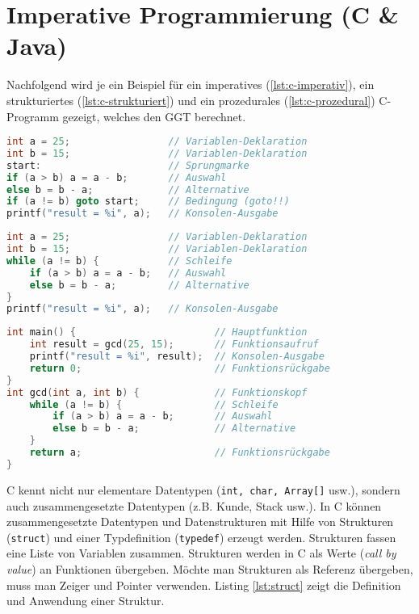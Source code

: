 \chapter{Imperative Programmierung (C \& Java)}

Nachfolgend wird je ein Beispiel für ein imperatives (\ref{lst:c-imperativ}), ein strukturiertes (\ref{lst:c-strukturiert}) und ein prozedurales (\ref{lst:c-prozedural}) C-Programm gezeigt, welches den GGT berechnet.

\begin{lstlisting}[language=C, caption=Imperatives C-Programm, label=lst:c-imperativ]
int a = 25; 				// Variablen-Deklaration
int b = 15; 				// Variablen-Deklaration
start: 						// Sprungmarke
if (a > b) a = a - b; 		// Auswahl
else b = b - a; 			// Alternative
if (a != b) goto start; 	// Bedingung (goto!!)
printf("result = %i", a); 	// Konsolen-Ausgabe
\end{lstlisting}

\begin{lstlisting}[language=C, caption=Strukturiertes C-Programm, label=lst:c-strukturiert]
int a = 25; 				// Variablen-Deklaration
int b = 15; 				// Variablen-Deklaration
while (a != b) { 			// Schleife
	if (a > b) a = a - b; 	// Auswahl
	else b = b - a; 		// Alternative
}
printf("result = %i", a); 	// Konsolen-Ausgabe
\end{lstlisting}

\begin{lstlisting}[language=C, caption=Prozedurales C-Programm, label=lst:c-prozedural]
int main() { 						// Hauptfunktion
	int result = gcd(25, 15); 		// Funktionsaufruf
	printf("result = %i", result); 	// Konsolen-Ausgabe
	return 0; 						// Funktionsrückgabe
}
int gcd(int a, int b) { 			// Funktionskopf
	while (a != b) { 				// Schleife
		if (a > b) a = a - b; 		// Auswahl
		else b = b - a; 			// Alternative
	}
	return a; 						// Funktionsrückgabe
}
\end{lstlisting}

C kennt nicht nur elementare Datentypen (\verb|int, char, Array[]| usw.), sondern auch zusammengesetzte Datentypen (z.B. Kunde, Stack usw.). In C können zusammengesetzte Datentypen und Datenstrukturen mit Hilfe von Strukturen (\verb|struct|) und einer Typdefinition (\verb|typedef|) erzeugt werden. Strukturen fassen eine Liste von Variablen zusammen. Strukturen werden in C als Werte (\textit{call by value}) an Funktionen übergeben. Möchte man Strukturen als Referenz übergeben, muss man Zeiger und Pointer verwenden. Listing \ref{lst:struct} zeigt die Definition und Anwendung einer Struktur.

